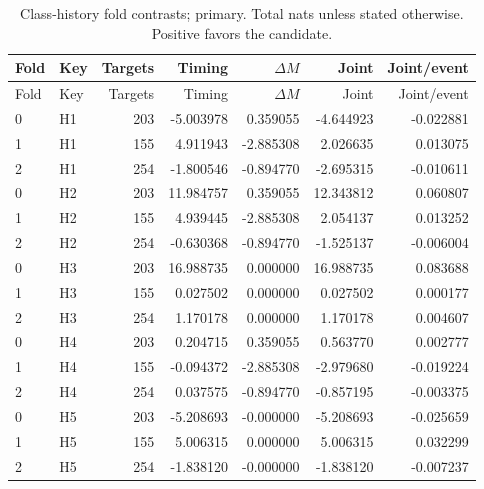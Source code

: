 {\small
\setlength{\tabcolsep}{3pt}
\begin{longtable}{llrrrrr}
\caption{Class-history fold contrasts; primary. Total nats unless stated otherwise. Positive favors the candidate.}\label{tab:H-primary}\\
\toprule
Fold & Key & Targets & Timing & $\Delta M$ & Joint & Joint/event\\\midrule
\endfirsthead
\toprule
Fold & Key & Targets & Timing & $\Delta M$ & Joint & Joint/event\\\midrule
\endhead
0 & H1 & 203 & -5.003978 & 0.359055 & -4.644923 & -0.022881\\
1 & H1 & 155 & 4.911943 & -2.885308 & 2.026635 & 0.013075\\
2 & H1 & 254 & -1.800546 & -0.894770 & -2.695315 & -0.010611\\
0 & H2 & 203 & 11.984757 & 0.359055 & 12.343812 & 0.060807\\
1 & H2 & 155 & 4.939445 & -2.885308 & 2.054137 & 0.013252\\
2 & H2 & 254 & -0.630368 & -0.894770 & -1.525137 & -0.006004\\
0 & H3 & 203 & 16.988735 & 0.000000 & 16.988735 & 0.083688\\
1 & H3 & 155 & 0.027502 & 0.000000 & 0.027502 & 0.000177\\
2 & H3 & 254 & 1.170178 & 0.000000 & 1.170178 & 0.004607\\
0 & H4 & 203 & 0.204715 & 0.359055 & 0.563770 & 0.002777\\
1 & H4 & 155 & -0.094372 & -2.885308 & -2.979680 & -0.019224\\
2 & H4 & 254 & 0.037575 & -0.894770 & -0.857195 & -0.003375\\
0 & H5 & 203 & -5.208693 & -0.000000 & -5.208693 & -0.025659\\
1 & H5 & 155 & 5.006315 & 0.000000 & 5.006315 & 0.032299\\
2 & H5 & 254 & -1.838120 & -0.000000 & -1.838120 & -0.007237\\
\bottomrule
\end{longtable}
}

